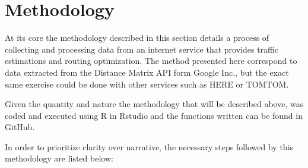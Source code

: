 \documentclass[a4paper]{jpconf}
\begin{document}
\section{Methodology}
\indent At its core the methodology described in this section details a process of collecting and processing data from an internet service that provides traffic estimations and routing optimization. The method presented here correspond to data extracted from the Distance Matrix API form Google Inc., but the exact same exercise could be done with other services such as HERE or TOMTOM.\par
\indent Given the quantity and nature the methodology that will be described above, was coded and executed using R in Rstudio and the functions written can be found in GitHub. \par
\indent In order to prioritize clarity over narrative, the necessary steps followed by this methodology are listed below: 
\end{document}
